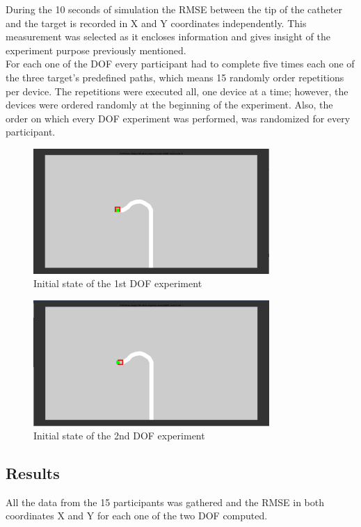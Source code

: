 During the 10 seconds of simulation the RMSE between the tip of the catheter and the target is recorded in X and Y coordinates independently. This measurement was selected as it encloses information and gives insight of the experiment purpose previously mentioned.\\

For each one of the DOF every participant had to complete five times each one of the three target's predefined paths, which means 15 randomly order repetitions per device. The repetitions were executed all, one device at a time; however, the devices were ordered randomly at the beginning of the experiment. Also, the order on which every DOF experiment was performed, was randomized for every participant.\\

\begin{figure}[ht]
   \centering
   \includegraphics[width=0.8\textwidth]{img/1stexp.PNG}
   \caption{Initial state of the 1st DOF experiment}
   \label{img:1stexp}
\end{figure}

\begin{figure}[ht]
   \centering
   \includegraphics[width=0.8\textwidth]{img/2ndexp.PNG}
   \caption{Initial state of the 2nd DOF experiment}
   \label{img:2ndexp}
\end{figure}

\subsection{Results}\label{subsec:1stres}
All the data from the 15 participants was gathered and the RMSE in both coordinates X and Y for each one of the two DOF computed.\\

